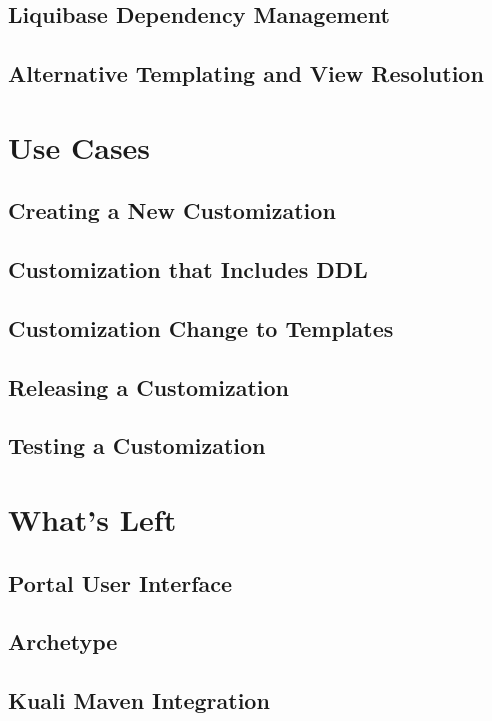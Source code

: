 \documentclass[12pt]{report}
\begin{document}
\subsection{Liquibase Dependency Management}

\subsection{Alternative Templating and View Resolution}

\section{Use Cases}

\subsection{Creating a New Customization}

\subsection{Customization that Includes DDL}

\subsection{Customization Change to Templates}

\subsection{Releasing a Customization}

\subsection{Testing a Customization}

\section{What's Left}

\subsection{Portal User Interface}

\subsection{Archetype}

\subsection{Kuali Maven Integration}
\end{document}
